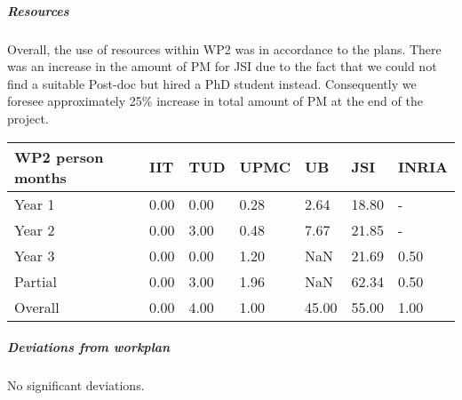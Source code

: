 
\subparagraph{Resources}
Overall, the use of resources within WP2 was in accordance to the plans. There was an increase in the amount of PM for JSI due to the fact that we could not find a suitable Post-doc but hired a PhD student instead. Consequently we foresee approximately 25\% increase in total amount of PM at the end of the project.

\begin{center}
\begin{tabular}{|C{1.5cm}|C{1.5cm}|C{1.5cm}|C{2cm}|C{2cm}|C{2cm}|C{2cm}|}
\hline
\footnotesize \textbf{WP2 person months}& \footnotesize \textbf{IIT}&\footnotesize \textbf{TUD}&\footnotesize \textbf{UPMC}& \footnotesize \textbf{UB} &\footnotesize \textbf{JSI} & \footnotesize \textbf{INRIA} \\ \hline
\footnotesize Year 1 &  0.00     & 0.00 & 0.28 & 2.64 & 18.80  &-  \\  \hline
\footnotesize Year 2 &  0.00     & 3.00 & 0.48 & 7.67 & 21.85  &-  \\  \hline
\footnotesize Year 3 &  0.00     & 0.00 & 1.20 & NaN & 21.69  & 0.50  \\  \hline
\footnotesize Partial &  0.00     & 3.00 & 1.96 & NaN & 62.34 & 0.50 \\ \hline \hline
\footnotesize Overall & 0.00     & 4.00 & 1.00 & 45.00 & 55.00 & 1.00 \\ \hline
\end{tabular}
\end{center}

\subparagraph{Deviations from workplan} 
No significant deviations.